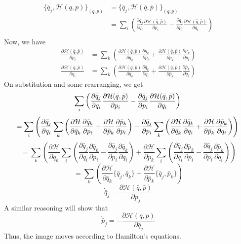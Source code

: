 \documentclass[12pt,a4paper]{report}
\newcommand{\parder}[2]{\frac{\partial#1}{\partial#2}}
\newcommand{\hamiltonian}{\mathcal{H}}
\begin{document}
\begin{align*}
    \{\bar{q}_j, \hamiltonian(q, p)\}_{(q, p)} &= \{\bar{q}_j, \hamiltonian(\bar{q}, \bar{p})\}_{(q, p)} \\
    &= \sum_i \left( \parder{\bar{q}_j}{q_i}\parder{\hamiltonian(\bar{q}, \bar{p})}{p_i} - \parder{\bar{q}_j}{p_i}\parder{\hamiltonian(\bar{q}, \bar{p})}{q_i} \right) \\
\end{align*}
Now, we have
\begin{align*}
    \parder{\hamiltonian(\bar{q}, \bar{p})}{p_i} &= \sum_{k} \left( \parder{\hamiltonian(\bar{q}, \bar{p})}{\bar{q}_k} \parder{\bar{q}_k}{p_i} + \parder{\hamiltonian(\bar{q}, \bar{p})}{\bar{p}_k} \parder{\bar{p}_k}{p_i} \right) \\
    \parder{\hamiltonian(\bar{q}, \bar{p})}{q_i} &= \sum_{k} \left( \parder{\hamiltonian(\bar{q}, \bar{p})}{\bar{q}_k} \parder{\bar{q}_k}{q_i} + \parder{\hamiltonian(\bar{q}, \bar{p})}{\bar{p}_k} \parder{\bar{p}_k}{q_i} \right)
\end{align*}
On substitution and some rearranging, we get
\begin{equation*}
    \sum_i \left( \parder{\bar{q}_j}{q_i}\parder{\hamiltonian(\bar{q}, \bar{p})}{p_i} - \parder{\bar{q}_j}{p_i}\parder{\hamiltonian(\bar{q}, \bar{p})}{q_i} \right) \\
\end{equation*}
\begin{equation*}
    = \sum_i \left( \parder{\bar{q}_j}{q_i} \sum_{k} \left( \parder{\hamiltonian}{\bar{q}_k} \parder{\bar{q}_k}{p_i} + \parder{\hamiltonian}{\bar{p}_k} \parder{\bar{p}_k}{p_i} \right) - \parder{\bar{q}_j}{p_i}\sum_{k} \left( \parder{\hamiltonian}{\bar{q}_k} \parder{\bar{q}_k}{q_i} + \parder{\hamiltonian}{\bar{p}_k} \parder{\bar{p}_k}{q_i} \right) \right) \\
\end{equation*}
\begin{equation*}
    = \sum_{k}\left( \parder{\hamiltonian}{\bar{q}_k}\sum_{i}\left( \parder{\bar{q}_j}{q_i}\parder{\bar{q}_k}{p_i} - \parder{\bar{q}_j}{p_i}\parder{\bar{q}_k}{q_i} \right) + \parder{\hamiltonian}{\bar{p}_k}\sum_{i}\left( \parder{\bar{q}_j}{q_i}\parder{\bar{p}_k}{p_i} - \parder{\bar{q}_j}{p_i}\parder{\bar{p}_k}{q_i} \right) \right)
\end{equation*}
\begin{equation*}
    = \sum_{k}\left( \parder{\hamiltonian}{\bar{q}_k}\{\bar{q}_j, \bar{q}_k\} + \parder{\hamiltonian}{\bar{p}_k}\{\bar{q}_j, \bar{p}_k\} \right)
\end{equation*}
\begin{equation*}
    \dot{\bar{q}}_j = \parder{\hamiltonian(\bar{q}, \bar{p})}{\bar{p}_j}
\end{equation*}
A similar reasoning will show that
\begin{equation*}
    \dot{\bar{p}}_j = -\parder{\hamiltonian(\bar{q}, \bar{p})}{\bar{q}_j}
\end{equation*}
Thus, the image moves according to Hamilton's equations.
\end{document}
